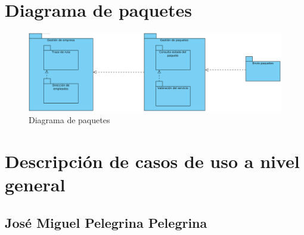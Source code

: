 \documentclass[12pt,spanish]{article}
\begin{document}
\section{Diagrama de paquetes}

\begin{figure}[H]
\centering
\includegraphics[scale=0.5]{paquetes.png}
\caption{Diagrama de paquetes}
\end{figure}

\section{Descripción de casos de uso a nivel general}

\subsection{José Miguel Pelegrina Pelegrina}

\end{document}
